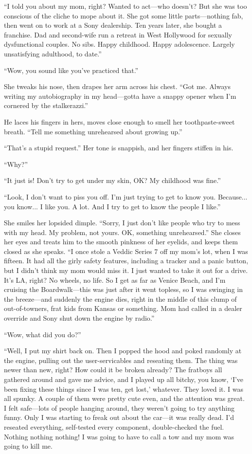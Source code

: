 “I told you about my mom, right? Wanted to act—who doesn’t? But she
was too conscious of the cliche to mope about it. She got some
little parts—nothing fab, then went on to work at a Sony
dealership. Ten years later, she bought a franchise. Dad and
second-wife run a retreat in West Hollywood for sexually
dysfunctional couples. No sibs. Happy childhood. Happy adolescence.
Largely unsatisfying adulthood, to date.”

“Wow, you sound like you’ve practiced that.”

She tweaks his nose, then drapes her arm across his chest. “Got me.
Always writing my autobiography in my head—gotta have a snappy
opener when I’m cornered by the stalkerazzi.”

He laces his fingers in hers, moves close enough to smell her
toothpaste-sweet breath. “Tell me something unrehearsed about
growing up.”

“That’s a stupid request.” Her tone is snappish, and her fingers
stiffen in his.

“Why?”

“It just is! Don’t try to get under my skin, OK? My childhood was
fine.”

“Look, I don’t want to piss you off. I’m just trying to get to know
you. Because... you know... I like you. A lot. And I try to get to
know the people I like.”

She smiles her lopsided dimple. “Sorry, I just don’t like people
who try to mess with my head. My problem, not yours. OK, something
unrehearsed.” She closes her eyes and treats him to the smooth
pinkness of her eyelids, and keeps them closed as she speaks. “I
once stole a Veddic Series 7 off my mom’s lot, when I was fifteen.
It had all the girly safety features, including a tracker and a
panic button, but I didn’t think my mom would miss it. I just
wanted to take it out for a drive. It’s LA, right? No wheels, no
life. So I get as far as Venice Beach, and I’m cruising the
Boardwalk—this was just after it went topless, so I was swinging in
the breeze—and suddenly the engine dies, right in the middle of
this clump of out-of-towners, frat kids from Kansas or something.
Mom had called in a dealer override and Sony shut down the engine
by radio.”

“Wow, what did you do?”

“Well, I put my shirt back on. Then I popped the hood and poked
randomly at the engine, pulling out the user-servicables and
reseating them. The thing was newer than new, right? How could it
be broken already? The fratboys all gathered around and gave me
advice, and I played up all bitchy, you know, ‘I’ve been fixing
these things since I was ten, get lost,’ whatever. They loved it. I
was all spunky. A couple of them were pretty cute even, and the
attention was great. I felt safe—lots of people hanging around,
they weren’t going to try anything funny. Only I was starting to
freak out about the car—it was really dead. I’d reseated
everything, self-tested every component, double-checked the fuel.
Nothing nothing nothing! I was going to have to call a tow and my
mom was going to kill me.

